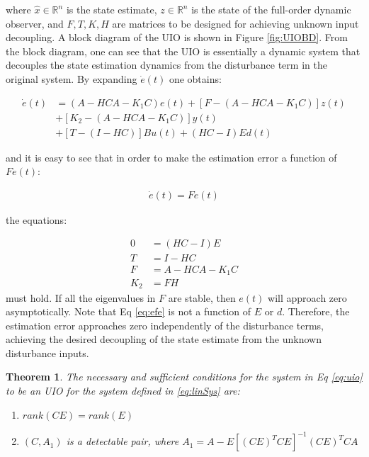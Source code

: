 \documentclass{amsart}
\newtheorem{theorem}{Theorem}[section]
\theoremstyle{definition}
\theoremstyle{remark}
\numberwithin{equation}{section}
\begin{document}
where $\hat{x} \in \mathbb{R}^n$ is the state estimate, $z \in \mathbb{R}^n$ is the state of the full-order dynamic observer, and $F,T,K,H$ are matrices to be designed for achieving unknown input decoupling. A block diagram of the UIO is shown in Figure \ref{fig:UIOBD}.  From the block diagram, one can see that the UIO is essentially a dynamic system that decouples the state estimation dynamics from the disturbance term in the original system. By expanding $\dot{e}(t)$ one obtains: 

\begin{align*}
\dot{e}(t) &= (A-HCA-K_1 C)e(t) + \left [ F-(A-HCA-K_1 C) \right ]z(t) \\
&+[K_2 - (A-HCA-K_1 C)]y(t) \\
&+ [T-(I-HC)]Bu(t) + (HC-I)Ed(t)
\end{align*}

and it is easy to see that in order to make the estimation error a function of $Fe(t)$:

\begin{align}
\dot{e}(t) = Fe(t) \label{eq:efe}
\end{align}



the equations: 

\begin{align}
0       &= (HC-I)E \label{eq:HCIE}\\
T       &= I - HC \\ 
F       &= A-HCA-K_1 C \label{eq:F}\\
K_2     &= FH
\end{align}
must hold. If all the eigenvalues in $F$ are stable, then $e(t)$ will approach zero asymptotically.  Note that Eq \ref{eq:efe} is not a function of $E$ or $d$.  Therefore, the estimation error approaches zero independently of the disturbance terms, achieving the desired decoupling of the state estimate from the unknown disturbance inputs.  

\begin{theorem}The necessary and sufficient conditions for the system in Eq \ref{eq:uio} to be an UIO for the system defined in \ref{eq:linSys} are: 
\begin{enumerate}
    \item $rank(CE)=rank(E)$
    \item $(C,A_1)$ is a detectable pair, where $A_1 = A-E[(CE)^T CE]^{-1} (CE)^T CA$
\end{enumerate}
\end{theorem}
\end{document}
